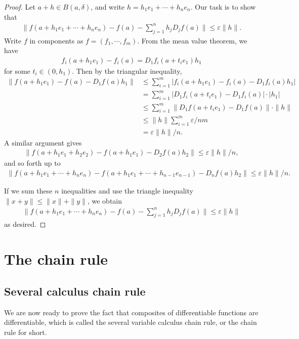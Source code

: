 \begin{proof}
    Let $a + h \in B(a, \delta)$, and write $h = h_1e_1 + \cdots + h_ne_n$. Our task is to show that
        \begin{align*}
            \Big\|f(a + h_1e_1 + \cdots + h_ne_n) - f(a) - \sum_{j = 1}^{n}h_jD_jf(a)\Big\| \leq \varepsilon\|h\|.
        \end{align*}
Write $f$ in components as $f = (f_1, \cdots, f_m)$. From the mean value theorem, we have
        \begin{align*}
            f_i(a + h_1e_1) - f_i(a) = D_1f_i(a + t_ie_1)h_1
        \end{align*}
for some $t_i \in (0, h_1)$. Then by the triangular inequality,
        \begin{align*}
            \|f(a + h_1e_1) - f(a) - D_1f(a)h_1\|
            &\leq \sum_{i = 1}^{m}|f_i(a + h_1e_1) - f_i(a) - D_1f_i(a)h_1|\\
            &= \sum_{i = 1}^{m}|D_1f_i(a + t_ie_1) - D_1f_i(a)|\cdot|h_1|\\
            &\leq \sum_{i = 1}^{m}\|D_1f(a + t_ie_1) - D_1f(a)\|\cdot\|h\|\\
            &\leq \|h\|\sum_{i = 1}^{m}\varepsilon/nm\\
            &= \varepsilon\|h\|/n.
        \end{align*}
A similar argument gives
        \begin{align*}
            \|f(a + h_1e_1 + h_2e_2) - f(a + h_1e_1) - D_2f(a)h_2\|
            \leq \varepsilon\|h\|/n,
        \end{align*}
and so forth up to
        \begin{align*}
            \|f(a + h_1e_1 + \cdots + h_ne_n) - f(a + h_1e_1 + \cdots + h_{n - 1}e_{n - 1}) - D_nf(a)h_2\|
            \leq \varepsilon\|h\|/n.
        \end{align*}

If we sum these $n$ inequalities and use the triangle inequality $\|x + y\| \leq \|x\| + \|y\|$, we obtain
        \begin{align*}
            \Big\|f(a + h_1e_1 + \cdots + h_ne_n) - f(a) - \sum_{j = 1}^{n}h_jD_jf(a)\Big\| \leq \varepsilon\|h\|
        \end{align*}
as desired.
\end{proof}

\section{The chain rule}

\subsection{Several calculus chain rule}
We are now ready to prove the fact that composites of differentiable functions are differentiable, which is called the several variable calculus chain rule, or the chain rule for short.

